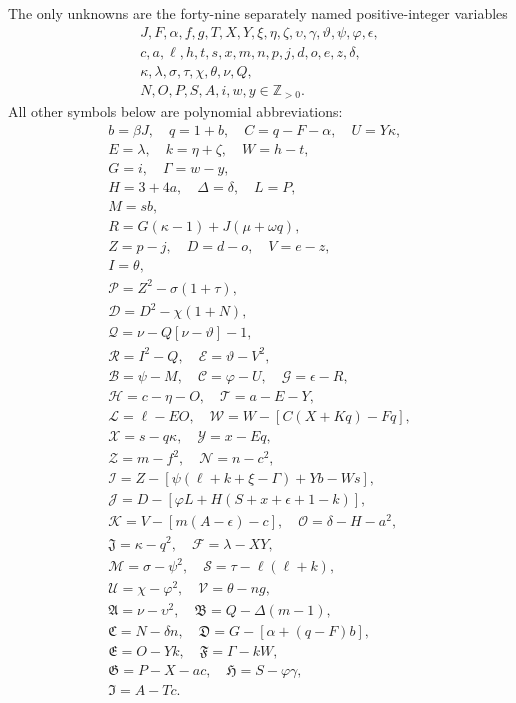 The only unknowns are the forty-nine separately named positive-integer variables
\[
\begin{gathered}J,F,\alpha,f,g,T,X,Y,\xi,\eta,\zeta,\upsilon,\gamma,\vartheta,\psi,\varphi,\epsilon,\\
c,a,\ell,h,t,s,x,m,n,p,j,d,o,e,z,\delta,\\
\kappa,\lambda,\sigma,\tau,\chi,\theta,\nu,Q,\\
N,O,P,S,A,i,w,y\in\mathbb Z_{>0}.\end{gathered}
\]
All other symbols below are polynomial abbreviations:
\[
\begin{gathered}
b=\beta J,\quad q=1+b,\quad C=q-F-\alpha,\quad U=Y\kappa,\\
E=\lambda,\quad k=\eta+\zeta,\quad W=h-t,\\
G=i,\quad\Gamma=w-y,\\
H=3+4a,\quad\Delta=\delta,\quad L=P,\\
M=sb,\\
R=G(\kappa-1)+J(\mu+\omega q),\\
Z=p-j,\quad D=d-o,\quad V=e-z,\\
I=\theta,\\
\mathcal{P}=Z^2-\sigma(1+\tau),\\
\mathcal{D}=D^2-\chi(1+N),\\
\mathcal{Q}=\nu-Q[\nu-\vartheta]-1,\\
\mathcal{R}=I^2-Q,\quad \mathcal{E}=\vartheta-V^2,\\
\mathcal{B}=\psi-M,\quad \mathcal{C}=\varphi-U,\quad \mathcal{G}=\epsilon-R,\\
\mathcal{H}=c-\eta-O,\quad \mathcal{T}=a-E-Y,\\
\mathcal{L}=\ell-EO,\quad \mathcal{W}=W-[C(X+Kq)-Fq],\\
\mathcal{X}=s-q\kappa,\quad \mathcal{Y}=x-Eq,\\
\mathcal{Z}=m-f^2,\quad \mathcal{N}=n-c^2,\\
\mathcal{I}=Z-[\psi(\ell+k+\xi-\Gamma)+Yb-Ws],\\
\mathcal{J}=D-[\varphi L+H(S+x+\epsilon+1-k)],\\
\mathcal{K}=V-[m(A-\epsilon)-c],\quad\mathcal{O}=\delta-H-a^2,\\
\mathfrak{J}=\kappa-q^2,\quad\mathcal{F}=\lambda-XY,\\
\mathcal{M}=\sigma-\psi^2,\quad\mathcal{S}=\tau-\ell(\ell+k),\\
\mathcal{U}=\chi-\varphi^2,\quad\mathcal{V}=\theta-ng,\\
\mathfrak{A}=\nu-\upsilon^2,\quad\mathfrak{B}=Q-\Delta(m-1),\\
\mathfrak{C}=N-\delta n,\quad\mathfrak{D}=G-[\alpha+(q-F)b],\\
\mathfrak{E}=O-Yk,\quad\mathfrak{F}=\Gamma-kW,\\
\mathfrak{G}=P-X-ac,\quad\mathfrak{H}=S-\varphi\gamma,\\
\mathfrak{I}=A-Tc.
\end{gathered}
\]
